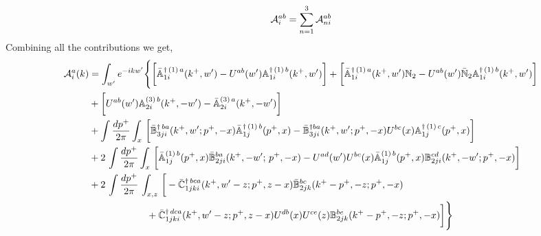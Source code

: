 \documentclass[10pt]{article}
\def\mf#1{\mathbb{#1}}
\numberwithin{equation}{section}
\begin{document}
\begin{align}
    {\cal A}^{ab}_i = \sum_{n=1}^3 {\cal A}^{ab}_{n i} 
\end{align}
Combining all the contributions we get,
    \begin{align}
         {\cal A}^{a}_{i}(k) & = \int_{w^{\prime}}e^{-ikw^{\prime}} \Bigg\{\bigg[\bar{\mf{A}}^{\dagger\,(1)\,a}_{1i}(k^{+},w^{\prime})-U^{ab}(w^{\prime})\mf{A}^{\dagger\, (1)\, b}_{1i}(k^{+},
         w^{\prime})\bigg]+\bigg[\bar{\mf{A}}^{\dagger\,(1)\,a}_{1i}(k^{+},w^{\prime})\mf{N}_{2} -U^{ab}(w^{\prime})\bar{\mf{N}}_{2}\mf{A}^{\dagger\, (1)\, b}_{1i}(k^{+},w^{\prime})\bigg]\notag 
         \\ & +\bigg[U^{ab}(w^{\prime})\mf{A}^{(3)\, b}_{2i}(k^{+},- w^{\prime})-\Bar{\mf{A}}^{(3)\, a}_{2i}(k^{+}, - w^{\prime})\bigg]\notag 
         \\ & 
         +\int \frac{dp^{+}}{2\pi}\int_{x}\,\bigg[\Bar{\mf{B}}^{\dagger\, ba}_{3ji}(k^{+}, w^{\prime}; p^{+}, -x)\Bar{\mf{A}}^{\dagger\, (1)\,b}_{1j}(p^{+}, x)
         -\Bar{\mf{B}}^{\dagger ba}_{3ji}(k^{+},w^{\prime}; p^{+},-x) U^{bc}(x) \mf{A}^{\dagger\,(1)\, c}_{1j}(p^{+},x)\bigg]\notag
         \\ & 
         +2\,\int \frac{dp^{+}}{2\pi}\int_{x}\,\bigg[ \Bar{\mf{A}}^{(1)\, b}_{1j}(p^{+}, x)\Bar{\mf{B}}^{ba}_{2ji}(k^{+},-w^{\prime};\,p^{+}, -x) -U^{ad}(w^\prime)U^{bc}(x) \bar{\mf{A}}^{(1)\, b}_{1j}(p^+,x) {\mf{B}}^{cd}_{2ji} (k^+, -w^\prime;p^+, -x)\bigg]\notag 
         \\ & 
         +2\, \int \frac{dp^{+}}{2\pi}\,\int_{x,z}\, \bigg[-\Bar{\mf{C}}^{\dagger\, bca}_{1jki}(k^{+},w^{\prime}-z;p^{+},z-x)\Bar{\mf{B}}^{bc}_{2jk}(k^{+}-p^{+},- z;p^{+},-x)
         \notag \\ & \qquad \qquad \qquad  +\bar{\mf{C}}^{\dagger\, dca}_{1jki}(k^+,w^\prime-z; p^+, z-x)  
                 U^{db}(x)
                 U^{ce}(z) 
                {\mf{B}}^{be}_{2jk} (k^{+}-p^+, -z; p^+, -x) \bigg] \Bigg\}
   \end{align}   
\end{document}
